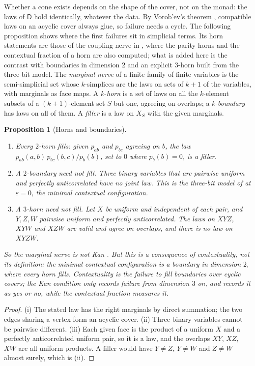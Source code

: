 \documentclass[11pt]{article}
\newtheorem{proposition}[theorem]{Proposition}
\theoremstyle{definition}
\theoremstyle{remark}
\newcommand{\D}{\mathsf{D}}
\begin{document}
Whether a cone exists depends on the shape of the cover, not on the monad: the laws of $\D$ hold identically, whatever the data.
By Vorob'ev's theorem \cite{Vorobev1962}, compatible laws on an acyclic cover always glue, so failure needs a cycle. The
following proposition shows where the first failures sit in simplicial terms. Its horn statements are those of the coupling
nerve in \cite[Thm.~4.2, Thm.~4.3, Cor.~4.4]{Conditionals}, where the parity horns and the contextual fraction of a horn are also computed; what is
added here is the contrast with boundaries in dimension $2$ and an explicit $3$-horn built from the three-bit model. The \emph{marginal nerve} of a finite family of
finite variables is the semi-simplicial set whose $k$-simplices are the laws on sets of $k+1$ of the variables, with marginals as
face maps. A $k$-\emph{horn} is a set of laws on all the $k$-element subsets of a $(k+1)$-element set $S$ but one, agreeing on
overlaps; a $k$-\emph{boundary} has laws on all of them. A \emph{filler} is a law on $X_S$ with the given marginals.

\begin{proposition}[Horns and boundaries]\label{prop:horns}
\leavevmode
\begin{enumerate}[label=(\roman*)]
\item Every $2$-horn fills: given $p_{ab}$ and $p_{bc}$ agreeing on $b$, the law $p_{ab}(a,b)\,p_{bc}(b,c)/p_b(b)$, set to $0$ where
  $p_b(b)=0$, is a filler.
\item A $2$-boundary need not fill. Three binary variables that are pairwise uniform and perfectly anticorrelated have no joint
  law. This is the three-bit model of \cite[Ex.~3.3]{Bridges} at $\varepsilon=0$, the minimal contextual configuration.
\item A $3$-horn need not fill. Let $X$ be uniform and independent of each pair, and $Y,Z,W$ pairwise uniform and perfectly
  anticorrelated. The laws on $XYZ$, $XYW$ and $XZW$ are valid and agree on overlaps, and there is no law on $XYZW$.
\end{enumerate}
So the marginal nerve is not Kan \cite[Cor.~4.4]{Conditionals}. But this is a consequence of contextuality, not its definition: the minimal contextual
configuration is a boundary in dimension $2$, where every horn fills. Contextuality is the failure to fill boundaries over cyclic
covers; the Kan condition only records failure from dimension $3$ on, and records it as yes or no, while the contextual fraction
measures it.
\end{proposition}
\begin{proof}
(i) The stated law has the right marginals by direct summation; the two edges sharing a vertex form an acyclic cover.
(ii) Three binary variables cannot be pairwise different. (iii) Each given face is the product of a uniform $X$ and a perfectly
anticorrelated uniform pair, so it is a law, and the overlaps $XY$, $XZ$, $XW$ are all uniform products. A filler would have $Y\ne Z$,
$Y\ne W$ and $Z\ne W$ almost surely, which is (ii).
\end{proof}
\end{document}
